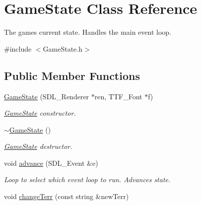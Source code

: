 \hypertarget{class_game_state}{}\section{Game\+State Class Reference}
\label{class_game_state}


The game\textquotesingle{}s current state. Handles the main event loop.  




{\ttfamily \#include $<$Game\+State.\+h$>$}

\subsection*{Public Member Functions}
\begin{DoxyCompactItemize}
\item 
\hyperlink{class_game_state_a6075ad239ad5e9cbb08da3e7b97fe676}{Game\+State} (S\+D\+L\+\_\+\+Renderer $\ast$ren, T\+T\+F\+\_\+\+Font $\ast$f)\hypertarget{class_game_state_a6075ad239ad5e9cbb08da3e7b97fe676}{}\label{class_game_state_a6075ad239ad5e9cbb08da3e7b97fe676}

\begin{DoxyCompactList}\small\item\em \hyperlink{class_game_state}{Game\+State} constructor. \end{DoxyCompactList}\item 
\hyperlink{class_game_state_ae623df5042cd0c17daa3394fdcb397b3}{$\sim$\+Game\+State} ()\hypertarget{class_game_state_ae623df5042cd0c17daa3394fdcb397b3}{}\label{class_game_state_ae623df5042cd0c17daa3394fdcb397b3}

\begin{DoxyCompactList}\small\item\em \hyperlink{class_game_state}{Game\+State} destructor. \end{DoxyCompactList}\item 
void \hyperlink{class_game_state_a6635a5af1ea4211afcfec058445ff933}{advance} (S\+D\+L\+\_\+\+Event \&e)\hypertarget{class_game_state_a6635a5af1ea4211afcfec058445ff933}{}\label{class_game_state_a6635a5af1ea4211afcfec058445ff933}

\begin{DoxyCompactList}\small\item\em Loop to select which event loop to run. Advances state. \end{DoxyCompactList}\item 
void \hyperlink{class_game_state_ab3c0c9f3f38b875735cfe39ce6a2c154}{change\+Terr} (const string \&new\+Terr)\hypertarget{class_game_state_ab3c0c9f3f38b875735cfe39ce6a2c154}{}\label{class_game_state_ab3c0c9f3f38b875735cfe39ce6a2c154}


\end{DoxyCompactItemize}
